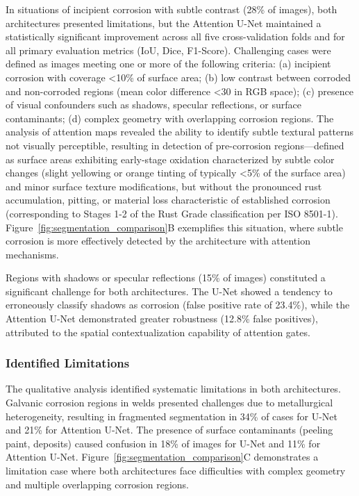 \documentclass[Journal,letterpaper]{ascelike-new}
\begin{document}
In situations of incipient corrosion with subtle contrast (28\% of images), both architectures presented limitations, but the Attention U-Net maintained a statistically significant improvement across all five cross-validation folds and for all primary evaluation metrics (IoU, Dice, F1-Score). Challenging cases were defined as images meeting one or more of the following criteria: (a) incipient corrosion with coverage <10\% of surface area; (b) low contrast between corroded and non-corroded regions (mean color difference <30 in RGB space); (c) presence of visual confounders such as shadows, specular reflections, or surface contaminants; (d) complex geometry with overlapping corrosion regions. The analysis of attention maps revealed the ability to identify subtle textural patterns not visually perceptible, resulting in detection of pre-corrosion regions---defined as surface areas exhibiting early-stage oxidation characterized by subtle color changes (slight yellowing or orange tinting of typically <5\% of the surface area) and minor surface texture modifications, but without the pronounced rust accumulation, pitting, or material loss characteristic of established corrosion (corresponding to Stages 1-2 of the Rust Grade classification per ISO 8501-1). Figure~\ref{fig:segmentation_comparison}B exemplifies this situation, where subtle corrosion is more effectively detected by the architecture with attention mechanisms.

Regions with shadows or specular reflections (15\% of images) constituted a significant challenge for both architectures. The U-Net showed a tendency to erroneously classify shadows as corrosion (false positive rate of 23.4\%), while the Attention U-Net demonstrated greater robustness (12.8\% false positives), attributed to the spatial contextualization capability of attention gates.

\subsubsection{Identified Limitations}

The qualitative analysis identified systematic limitations in both architectures. Galvanic corrosion regions in welds presented challenges due to metallurgical heterogeneity, resulting in fragmented segmentation in 34\% of cases for U-Net and 21\% for Attention U-Net. The presence of surface contaminants (peeling paint, deposits) caused confusion in 18\% of images for U-Net and 11\% for Attention U-Net. Figure~\ref{fig:segmentation_comparison}C demonstrates a limitation case where both architectures face difficulties with complex geometry and multiple overlapping corrosion regions.
\end{document}
